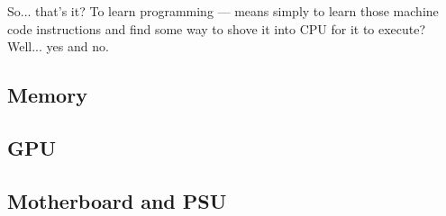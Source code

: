\documentclass[../../what-is-computer.tex]{subfiles}
\begin{document}
    So... that's it? To learn programming --- means simply to learn those machine code instructions and find some way to shove it into CPU for it to execute?
    Well... yes and no.

    \subsection{Memory}
    \subsection{GPU}
    \subsection{Motherboard and PSU}
\end{document}

